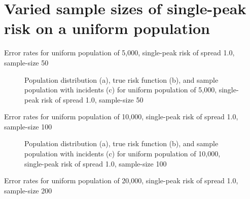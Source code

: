 \section{Varied sample sizes of single-peak risk on a uniform population}
\label{sec:app:results_unifXk_X_1.0_1h}


\begin{table}[H]
    
    \caption[]{Error rates for uniform population of 5,000, single-peak risk of \gls{spread} 1.0, sample-size 50}
    \label{tab:mean_error_rates:unif5k_50_1.0_1h}
\end{table}

\begin{figure}[H]
    
    \caption[]{Population distribution (a), true risk function (b), and sample population with incidents (c) for uniform population of 5,000, single-peak risk of \gls{spread} 1.0, sample-size 50}
    \label{fig:distributions:unif5k_50_1.0_1h}    
\end{figure}


\begin{table}[H]
    
    \caption[]{Error rates for uniform population of 10,000, single-peak risk of \gls{spread} 1.0, sample-size 100}
    \label{tab:mean_error_rates:unif10k_100_1.0_1h}
\end{table}

\begin{figure}[H]
    
    \caption[]{Population distribution (a), true risk function (b), and sample population with incidents (c) for uniform population of 10,000, single-peak risk of \gls{spread} 1.0, sample-size 100}
    \label{fig:distributions:unif10k_100_1.0_1h}    
\end{figure}



\begin{table}[H]
    
    \caption[]{Error rates for uniform population of 20,000, single-peak risk of \gls{spread} 1.0, sample-size 200}
    \label{tab:mean_error_rates:unif20k_200_1.0_1h}
\end{table}

